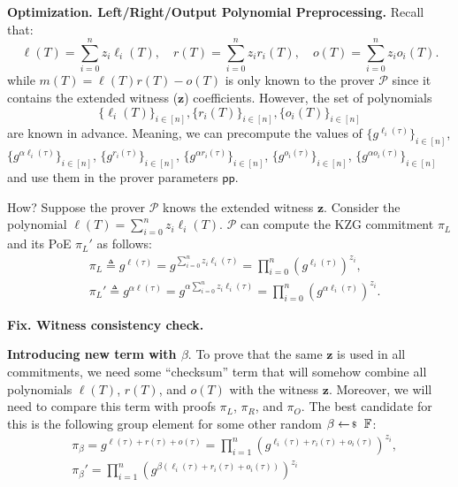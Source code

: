 \documentclass[../../book.tex]{subfiles}
\begin{document}
\textcolor{blue!75!gray}{\textbf{Optimization. Left/Right/Output Polynomial Preprocessing.}} Recall that:
\begin{equation*}
    \ell(T) = \sum_{i=0}^n z_i\ell_i(T), \quad r(T) = \sum_{i=0}^n z_i r_i(T), \quad o(T) = \sum_{i=0}^n z_io_i(T).
\end{equation*}
while $m(T) = \ell(T)r(T) - o(T)$ is only known to the prover $\mathcal{P}$ since it contains the extended witness ($\mathbf{z}$) coefficients. However, the set of polynomials
\begin{equation*}
    \{\ell_i(T)\}_{i \in [n]}, \{r_i(T)\}_{i \in [n]}, \{o_i(T)\}_{i \in [n]}
\end{equation*}
are known in advance. Meaning, we can precompute the values of $\{g^{\ell_i(\tau)}\}_{i \in [n]}$, $\{g^{\alpha \ell_i(\tau)}\}_{i \in [n]}$, $\{g^{r_i(\tau)}\}_{i \in [n]}$, $\{g^{\alpha r_i(\tau)}\}_{i \in [n]}$, $\{g^{o_i(\tau)}\}_{i \in [n]}$, $\{g^{\alpha o_i(\tau)}\}_{i \in [n]}$ and use them in the prover parameters $\mathsf{pp}$.

How? Suppose the prover $\mathcal{P}$ knows the extended witness $\mathbf{z}$. Consider the polynomial $\ell(T) = \sum_{i=0}^n z_i\ell_i(T)$. $\mathcal{P}$ can compute the KZG commitment $\pi_L$ and its PoE $\pi_L'$ as follows:
\begin{equation*}
    \begin{aligned}
        &\pi_L \triangleq g^{\ell(\tau)} = g^{\sum_{i=0}^n z_i\ell_i(\tau)} = \prod_{i=0}^n (g^{\ell_i(\tau)})^{z_i}, \\
        &\pi_L' \triangleq g^{\alpha \ell(\tau)} = g^{\alpha \sum_{i=0}^n z_i\ell_i(\tau)} = \prod_{i=0}^n (g^{\alpha \ell_i(\tau)})^{z_i}.        
    \end{aligned}
\end{equation*}

\textcolor{green!50!black}{\textbf{Fix. Witness consistency check.}} 

\textbf{Introducing new term with $\beta$}. To prove that the same $\mathbf{z}$ is used in all commitments, we need some ``checksum'' term that will somehow combine all polynomials $\ell(T)$, $r(T)$, and $o(T)$ with the witness $\mathbf{z}$. Moreover, we will need to compare this term with proofs $\pi_L$, $\pi_R$, and $\pi_O$. The best candidate for this is the following group element for some other random $\beta \leftarrowS \mathbb{F}$:
\begin{equation*}
    \begin{aligned}
        &\pi_{\beta} = g^{\ell(\tau) + r(\tau) + o(\tau)} = \prod_{i=1}^n (g^{\ell_i(\tau) + r_i(\tau) + o_i(\tau)})^{z_i}, \\ 
        &\pi_{\beta}' = \prod_{i=1}^n (g^{\beta(\ell_i(\tau) + r_i(\tau) + o_i(\tau))})^{z_i}        
    \end{aligned}
\end{equation*}
\end{document}
